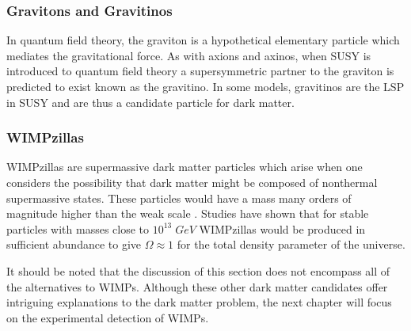 \documentclass[a4paper,12pt]{article}
\begin{document}
\subsubsection{Gravitons and Gravitinos}
In quantum field theory, the graviton is a hypothetical  elementary particle which mediates the gravitational force.  As with axions and axinos, when SUSY is introduced to quantum field theory a supersymmetric partner to the graviton is predicted to exist known as the gravitino.  In some models, gravitinos are the LSP in SUSY and are thus a candidate particle for dark matter.

\subsubsection{WIMPzillas}
WIMPzillas are supermassive dark matter particles which arise when one considers the possibility that dark matter might be composed of nonthermal supermassive states. These particles would have a mass many orders of magnitude higher than the weak scale \cite{Chung}. Studies have shown that for stable particles with masses close to $10^{13} \; GeV$  WIMPzillas would be produced in sufficient abundance to give $\Omega \approx 1$ for the total density parameter of the universe.  

It should be noted that the discussion of this section does not encompass all of the alternatives to WIMPs.   Although these other dark matter candidates offer intriguing explanations to the dark matter problem, the next chapter will focus on the experimental detection of WIMPs.



\singlespacing



\end{document}
